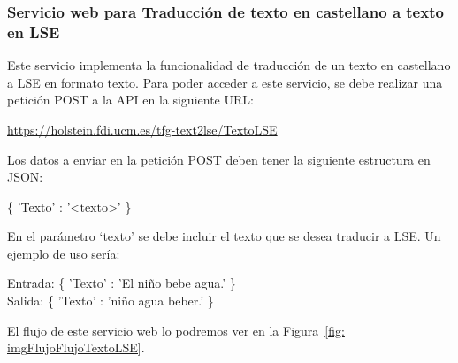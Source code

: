 \subsubsection{Servicio web para Traducción de texto en castellano a texto en LSE}
Este servicio implementa la funcionalidad de traducción de un texto en castellano a LSE en formato texto.
Para poder acceder a este servicio, se debe realizar una petición POST a la API en la siguiente URL:

\begin{shaded}
	\url{https://holstein.fdi.ucm.es/tfg-text2lse/TextoLSE}	
\end{shaded}


Los datos a enviar en la petición POST deben tener la siguiente estructura en JSON: 
\begin{center}
	
	\{ 'Texto' : '<texto>' \}
	
\end{center}

En el parámetro `texto' se debe incluir el texto que se desea traducir a LSE. Un ejemplo de uso sería: 
 

 
\begin{center}
 Entrada:  \{ 'Texto' : 'El niño bebe agua.' \}\\
 Salida:   \{ 'Texto' : 'niño agua beber.' \}
\end{center}


El flujo de este servicio web lo podremos ver en la Figura~\ref {fig: imgFlujoFlujoTextoLSE}.


